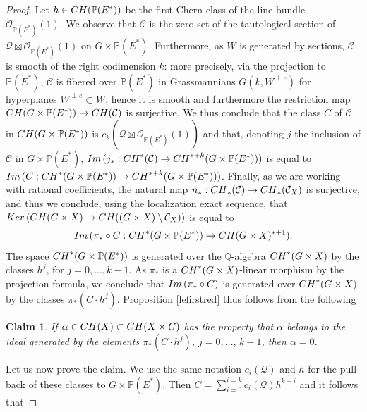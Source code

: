 \documentclass[10pt,a4paper]{amsart}
\newtheorem{claim}{Claim}
\begin{document}
\begin{proof} Let  $h\in{\rm CH}(\mathbb{P}(E^*))$ be the first Chern class of the line bundle $\mathcal{O}_{\mathbb{P}(E^*)}(1)$.
We observe that
$\mathcal{C}$ is the zero-set of the tautological section of $\mathcal{Q}\boxtimes \mathcal{O}_{\mathbb{P}(E^*)}(1)$ on $G\times \mathbb{P}(E^*)$. Furthermore, as
$W$ is generated by sections, $\mathcal{C}$ is smooth of the right codimension $k$: more precisely,
via the projection to $\mathbb{P}(E^*)$, $\mathcal{C}$ is fibered over $\mathbb{P}(E^*)$ in Grassmannians $G(k,W^{\perp e})$ for hyperplanes $W^{\perp e}\subset W$, hence it is smooth and furthermore the restriction map
${\rm CH}(G\times\mathbb{P}(E^*))\rightarrow {\rm CH}(\mathcal{C})$ is surjective.
We thus conclude that the class $C$ of $\mathcal{C}$ in ${\rm CH}(G\times \mathbb{P}(E^*))$ is
$c_k(\mathcal{Q}\boxtimes \mathcal{O}_{\mathbb{P}(E^*)}(1))$ and that, denoting $j$ the inclusion of
$\mathcal{C}$ in $ G\times \mathbb{P}(E^*)$, ${\rm Im}\,(j_*:{\rm CH}^*(\mathcal{C})\rightarrow
{\rm CH}^{*+k}(G\times \mathbb{P}(E^*)))$ is equal to
${\rm Im}\,(C:{\rm CH}^*(G\times \mathbb{P}(E^*)) \rightarrow
{\rm CH}^{*+k}(G\times \mathbb{P}(E^*)))$.
Finally, as we are working with rational coefficients, the natural map
$n_*:{\rm CH}_*(\mathcal{C})\rightarrow {\rm CH}_*(\mathcal{C}_X)$ is surjective, and thus we conclude, using the localization exact sequence, that
${\rm Ker}\,( {\rm CH}(G\times X)\rightarrow  {\rm CH}((G\times X)\setminus \mathcal{C}_X))$ is equal to
\begin{eqnarray}\label{eqmap} {\rm Im}\,(\pi_*\circ C:{\rm CH}^*(G\times \mathbb{P}(E^*)) \rightarrow
{\rm CH}(G\times X)^{*+1}).
\end{eqnarray}
The space ${\rm CH}^*(G\times \mathbb{P}(E^*))$ is generated over the $\mathbb{Q}$-algebra ${\rm CH}^*(G\times X)$ by the classes $h^j$, for $j=0,\ldots, k-1$. As $\pi_*$ is a
${\rm CH}^*(G\times X)$-linear morphism by the projection formula, we conclude that
$ {\rm Im}\,(\pi_*\circ C)$ is generated over ${\rm CH}^*(G\times X)$ by the classes
$\pi_*(C\cdot h^j)$.  Proposition \ref{lefirstred} thus  follows from the following
\begin{claim}\label{claim} If $\alpha\in{\rm CH}(X)\subset  {\rm CH}(X\times G)$ has the property that $\alpha$
belongs to the ideal generated by the elements  $\pi_*(C\cdot h^j)$, $j=0,\ldots,\,k-1$, then
$\alpha=0$.
\end{claim}
Let us now prove the claim.  We use the same notation  $c_i(\mathcal{Q})$ and $h$ for the pull-back of these classes to
$G\times \mathbb{P}(E^*)$. Then $C=\sum_{i=0}^{i=k} c_i(\mathcal{Q})h^{k-i}$
and it follows that


\end{proof}
\end{document}
